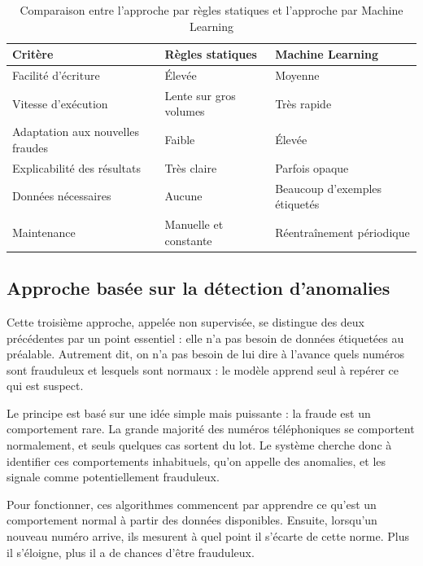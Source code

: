 \documentclass[12pt, oneside, a4paper]{report}
\begin{document}
\vspace{0.5cm}
\begin{table}[h!]
\centering
\caption{Comparaison entre l'approche par règles statiques et l'approche par Machine Learning}
\label{tab:approches}
\vspace{0.3cm}
\renewcommand{\arraystretch}{1.3}
\begin{tabular}{|l|l|l|}
\hline
\textbf{Critère} & \textbf{Règles statiques} & \textbf{Machine Learning} \\
\hline
Facilité d'écriture & Élevée & Moyenne \\
\hline
Vitesse d'exécution & Lente sur gros volumes & Très rapide \\
\hline
Adaptation aux nouvelles fraudes & Faible & Élevée \\
\hline
Explicabilité des résultats & Très claire & Parfois opaque \\
\hline
Données nécessaires & Aucune & Beaucoup d'exemples étiquetés \\
\hline
Maintenance & Manuelle et constante & Réentraînement périodique \\
\hline
\end{tabular}
\end{table}


\subsection{ Approche basée sur la détection d'anomalies}
Cette troisième approche, appelée non supervisée, se distingue des deux précédentes par un point essentiel : elle n'a pas besoin de données étiquetées au préalable. Autrement dit, on n'a pas besoin de lui dire à l'avance quels numéros sont frauduleux et lesquels sont normaux : le modèle apprend seul à repérer ce qui est suspect.

Le principe est basé sur une idée simple mais puissante : la fraude est un comportement rare. La grande majorité des numéros téléphoniques se comportent normalement, et seuls quelques cas sortent du lot. Le système cherche donc à identifier ces comportements inhabituels, qu'on appelle des anomalies, et les signale comme potentiellement frauduleux.

Pour fonctionner, ces algorithmes commencent par apprendre ce qu'est un comportement normal à partir des données disponibles. Ensuite, lorsqu'un nouveau numéro arrive, ils mesurent à quel point il s'écarte de cette norme. Plus il s'éloigne, plus il a de chances d'être frauduleux.
\end{document}
